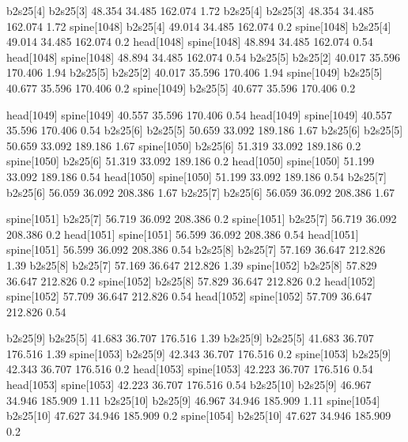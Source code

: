 b2s25[4]    b2s25[3]    48.354    34.485    162.074    1.72
b2s25[4]    b2s25[3]    48.354    34.485    162.074    1.72
spine[1048]    b2s25[4]    49.014    34.485    162.074    0.2
spine[1048]    b2s25[4]    49.014    34.485    162.074    0.2
head[1048]    spine[1048]    48.894    34.485    162.074    0.54
head[1048]    spine[1048]    48.894    34.485    162.074    0.54
b2s25[5]    b2s25[2]    40.017    35.596    170.406    1.94
b2s25[5]    b2s25[2]    40.017    35.596    170.406    1.94
spine[1049]    b2s25[5]    40.677    35.596    170.406    0.2
spine[1049]    b2s25[5]    40.677    35.596    170.406    0.2


head[1049]    spine[1049]    40.557    35.596    170.406    0.54
head[1049]    spine[1049]    40.557    35.596    170.406    0.54
b2s25[6]    b2s25[5]    50.659    33.092    189.186    1.67
b2s25[6]    b2s25[5]    50.659    33.092    189.186    1.67
spine[1050]    b2s25[6]    51.319    33.092    189.186    0.2
spine[1050]    b2s25[6]    51.319    33.092    189.186    0.2
head[1050]    spine[1050]    51.199    33.092    189.186    0.54
head[1050]    spine[1050]    51.199    33.092    189.186    0.54
b2s25[7]    b2s25[6]    56.059    36.092    208.386    1.67
b2s25[7]    b2s25[6]    56.059    36.092    208.386    1.67


spine[1051]    b2s25[7]    56.719    36.092    208.386    0.2
spine[1051]    b2s25[7]    56.719    36.092    208.386    0.2
head[1051]    spine[1051]    56.599    36.092    208.386    0.54
head[1051]    spine[1051]    56.599    36.092    208.386    0.54
b2s25[8]    b2s25[7]    57.169    36.647    212.826    1.39
b2s25[8]    b2s25[7]    57.169    36.647    212.826    1.39
spine[1052]    b2s25[8]    57.829    36.647    212.826    0.2
spine[1052]    b2s25[8]    57.829    36.647    212.826    0.2
head[1052]    spine[1052]    57.709    36.647    212.826    0.54
head[1052]    spine[1052]    57.709    36.647    212.826    0.54


b2s25[9]    b2s25[5]    41.683    36.707    176.516    1.39
b2s25[9]    b2s25[5]    41.683    36.707    176.516    1.39
spine[1053]    b2s25[9]    42.343    36.707    176.516    0.2
spine[1053]    b2s25[9]    42.343    36.707    176.516    0.2
head[1053]    spine[1053]    42.223    36.707    176.516    0.54
head[1053]    spine[1053]    42.223    36.707    176.516    0.54
b2s25[10]    b2s25[9]    46.967    34.946    185.909    1.11
b2s25[10]    b2s25[9]    46.967    34.946    185.909    1.11
spine[1054]    b2s25[10]    47.627    34.946    185.909    0.2
spine[1054]    b2s25[10]    47.627    34.946    185.909    0.2


